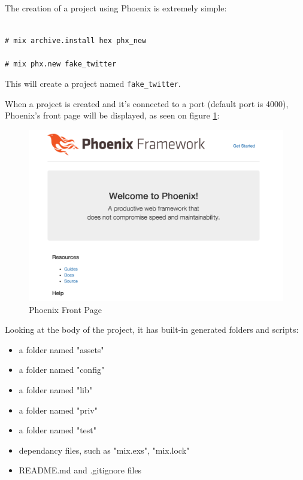 The creation of a project using Phoenix is extremely simple: \newline

{
\newcommand{\shellcmd}[1]{\\\indent\indent\texttt{\footnotesize\# #1}\\}
    \shellcmd{mix archive.install hex phx\_new}
    \shellcmd{mix phx.new fake\_twitter}
}

This will create a project named \texttt{fake\_twitter}. \newline

When a project is created and it's connected to a port (default port is 4000), Phoenix's front page will be displayed, as seen on figure \ref{fig:phoenix}:

\begin{figure}[htbp]
	\centering
	\includegraphics[width=1\linewidth]{figures/phoenix_welcome_page.png}  %
	\caption{Phoenix Front Page}
	\label{fig:phoenix}
\end{figure}

Looking at the body of the project, it has built-in generated folders and scripts:

\begin{itemize}
    \item a folder named "assets"
    \item a folder named "config"
    \item a folder named "lib"
    \item a folder named "priv"
    \item a folder named "test"
    \item dependancy files, such as "mix.exs", "mix.lock"
    \item README.md and .gitignore files
\end{itemize}

